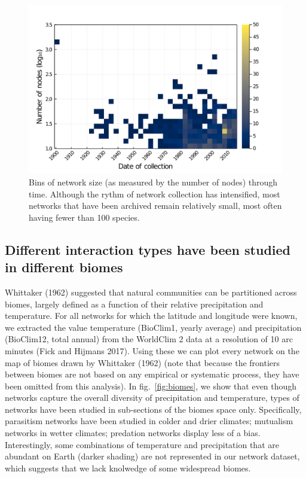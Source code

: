 \documentclass[10pt,oneside]{article}
\makeatletter
\def\maxwidth{\ifdim\Gin@nat@width>\linewidth\linewidth
\else\Gin@nat@width\fi}
\let\Oldincludegraphics\includegraphics
\renewcommand{\includegraphics}[1]{\Oldincludegraphics[width=\maxwidth]{#1}}
\makeatother
\begin{document}
\begin{figure}
\hypertarget{fig:size}{%
\centering
\includegraphics{figures/properties_over_time.png}
\caption{Bins of network size (as measured by the number of nodes)
through time. Although the rythm of network collection has intensified,
most networks that have been archived remain relatively small, most
often having fewer than 100 species.}\label{fig:size}
}
\end{figure}

\hypertarget{different-interaction-types-have-been-studied-in-different-biomes}{%
\subsection{Different interaction types have been studied in different
biomes}\label{different-interaction-types-have-been-studied-in-different-biomes}}

Whittaker (1962) suggested that natural communities can be partitioned
across biomes, largely defined as a function of their relative
precipitation and temperature. For all networks for which the latitude
and longitude were known, we extracted the value temperature (BioClim1,
yearly average) and precipitation (BioClim12, total annual) from the
WorldClim 2 data at a resolution of 10 arc minutes (Fick and Hijmans
2017). Using these we can plot every network on the map of biomes drawn
by Whittaker (1962) (note that because the frontiers between biomes are
not based on any empirical or systematic process, they have been omitted
from this analysis). In fig.~\ref{fig:biomes}, we show that even though
networks capture the overall diversity of precipitation and temperature,
types of networks have been studied in sub-sections of the biomes space
only. Specifically, parasitism networks have been studied in colder and
drier climates; mutualism networks in wetter climates; predation
networks display less of a bias. Interestingly, some combinations of
temperature and precipitation that are abundant on Earth (darker
shading) are not represented in our network dataset, which suggests that
we lack knolwedge of some widespread biomes.
\end{document}
